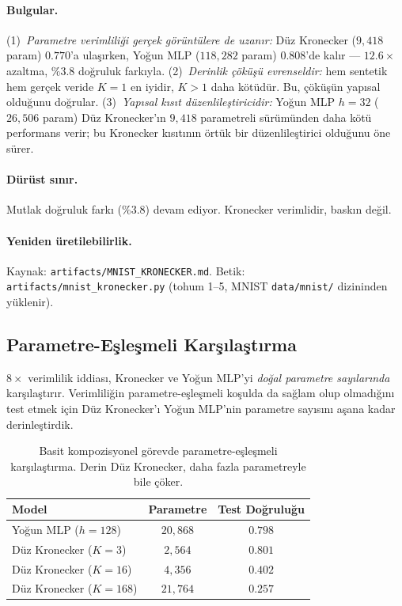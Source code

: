 \documentclass[11pt,a4paper]{article}
\begin{document}
\paragraph{Bulgular.}
(1)~\emph{Parametre verimliliği gerçek görüntülere de uzanır:}
Düz Kronecker ($9{,}418$ param) $0.770$'a ulaşırken, Yoğun MLP
($118{,}282$ param) $0.808$'de kalır --- $12.6\times$ azaltma,
$\%3.8$ doğruluk farkıyla.
(2)~\emph{Derinlik çöküşü evrenseldir:} hem sentetik hem gerçek
veride $K=1$ en iyidir, $K>1$ daha kötüdür. Bu, çöküşün yapısal
olduğunu doğrular.
(3)~\emph{Yapısal kısıt düzenlileştiricidir:} Yoğun MLP $h=32$
($26{,}506$ param) Düz Kronecker'ın $9{,}418$ parametreli sürümünden
daha kötü performans verir; bu Kronecker kısıtının örtük bir
düzenlileştirici olduğunu öne sürer.

\paragraph{Dürüst sınır.}
Mutlak doğruluk farkı ($\%3.8$) devam ediyor. Kronecker verimlidir,
baskın değil.

\paragraph{Yeniden üretilebilirlik.}
Kaynak: \texttt{artifacts/MNIST\_KRONECKER.md}.
Betik: \texttt{artifacts/mnist\_kronecker.py} (tohum 1--5,
MNIST \texttt{data/mnist/} dizininden yüklenir).

\subsection{Parametre-Eşleşmeli Karşılaştırma}
\label{sec:param-matched}

$8\times$ verimlilik iddiası, Kronecker ve Yoğun MLP'yi
\emph{doğal parametre sayılarında} karşılaştırır. Verimliliğin
parametre-eşleşmeli koşulda da sağlam olup olmadığını test etmek
için Düz Kronecker'ı Yoğun MLP'nin parametre sayısını aşana kadar
derinleştirdik.

\begin{table}[h]
\centering
\caption{Basit kompozisyonel görevde parametre-eşleşmeli karşılaştırma.
Derin Düz Kronecker, daha fazla parametreyle bile çöker.}
\label{tab:param-matched}
\small
\begin{tabular}{lcc}
\toprule
Model & Parametre & Test Doğruluğu \\
\midrule
Yoğun MLP ($h=128$)         & $20{,}868$ & $0.798$ \\
Düz Kronecker ($K=3$)       & $2{,}564$  & $0.801$ \\
Düz Kronecker ($K=16$)      & $4{,}356$  & $0.402$ \\
Düz Kronecker ($K=168$)     & $21{,}764$ & $0.257$ \\
\bottomrule
\end{tabular}
\end{table}
\end{document}
